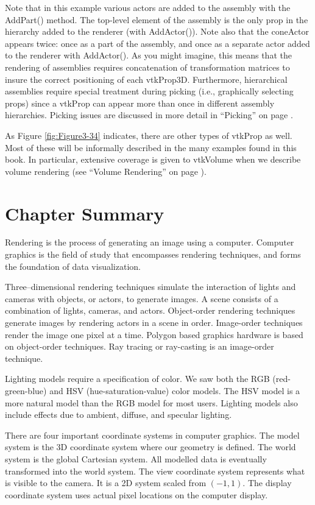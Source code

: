 \noindent Note that in this example various actors are added to the assembly with the AddPart() method. The top-level element of the assembly is the only prop in the hierarchy added to the renderer (with AddActor()). Note also that the coneActor appears twice: once as a part of the assembly, and once as a separate actor added to the renderer with AddActor(). As you might imagine, this means that the rendering of assemblies requires concatenation of transformation matrices to insure the correct positioning of each vtkProp3D. Furthermore, hierarchical assemblies require special treatment during picking (i.e., graphically selecting props) since a vtkProp can appear more than once in different assembly hierarchies. Picking issues are discussed in more detail in ``Picking'' on page \pageref{subsec:picking}.

As Figure \ref{fig:Figure3-34} indicates, there are other types of vtkProp as well. Most of these will be informally described in the many examples found in this book. In particular, extensive coverage is given to vtkVolume when we describe volume rendering (see ``Volume Rendering'' on page \pageref{sec:volume_rendering}).

\section{Chapter Summary}

Rendering is the process of generating an image using a computer. Computer graphics is the field of study that encompasses rendering techniques, and forms the foundation of data visualization.

Three--dimensional rendering techniques simulate the interaction of lights and cameras with objects, or actors, to generate images. A scene consists of a combination of lights, cameras, and actors. Object-order rendering techniques generate images by rendering actors in a scene in order. Image-order techniques render the image one pixel at a time. Polygon based graphics hardware is based on object-order techniques. Ray tracing or ray-casting is an image-order technique.

Lighting models require a specification of color. We saw both the RGB (red-green-blue) and HSV (hue-saturation-value) color models. The HSV model is a more natural model than the RGB model for most users. Lighting models also include effects due to ambient, diffuse, and specular lighting.

There are four important coordinate systems in computer graphics. The model system is the 3D coordinate system where our geometry is defined. The world system is the global Cartesian system. All modelled data is eventually transformed into the world system. The view coordinate system represents what is visible to the camera. It is a 2D system scaled from $(-1,1)$. The display coordinate system uses actual pixel locations on the computer display.

